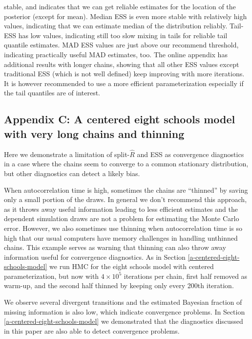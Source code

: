 \documentclass[american,]{article}
\theoremstyle{definition}
\begin{document}
stable, and indicates that we can get reliable estimates for the
location of the posterior (except for mean). Median ESS is even more
stable with relatively high values, indicating that we can estimate
median of the distribution reliably. Tail-ESS has low values,
indicating still too slow mixing in tails for reliable tail quantile
estimates. MAD ESS values are just above our recommend threshold,
indicating practically useful MAD estimates, too. The online appendix
has additional results with longer chains, showing that all other ESS
values except traditional ESS (which is not well defined) keep improving
with more iterations. It is however recommended to use a more efficient
parameterization especially if the tail quantiles are of
interest.


\hypertarget{a-centered-eight-schools-model-1}{%
\subsection*{Appendix C: A centered eight schools model with very long chains and
thinning}\label{a-centered-eight-schools-model-1}}


Here we demonstrate a limitation of split-\(\widehat{R}\) and ESS as
convergence diagnostics in a case where the chains seem to converge to
a common stationary distribution, but other diagnostics can detect a
likely bias.

When autocorrelation time is high, sometimes the chains are
``thinned'' by saving only a small portion of the draws.  In general
we don't recommend this approach, as it throws away useful information
leading to less efficient estimates and the dependent simulation draws
are not a problem for estimating the Monte Carlo error. However, we
also sometimes use thinning when autocorrelation time is so high that
our usual computers have memory challenges in handling unthinned
chains. This example serves as warning that thinning can also throw
away information useful for convergence diagnostics.
As in Section \ref{a-centered-eight-schools-model} we run HMC for the
eight schools model with centered parameterization, but now with
$4\times 10^5$ iterations per chain, first half removed as warm-up,
and the second half thinned by keeping only every 200th iteration.

We observe several divergent transitions and the estimated Bayesian
fraction of missing information \citep{betancourt2017conceptual} is
also low, which indicate convergence problems. In Section
\ref{a-centered-eight-schools-model} we demonstrated that the
diagnostics discussed in this paper are also able to detect
convergence problems.
\end{document}
